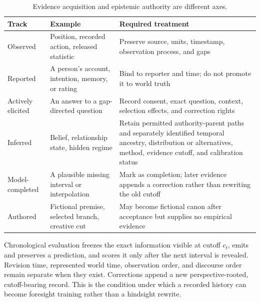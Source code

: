 \documentclass[10pt]{article}
\begin{document}
\begin{table}[H]
\centering
\scriptsize
\begin{tabularx}{\textwidth}{@{}p{}p{}Y@{}}
\toprule
Track & Example & Required treatment \\
\midrule
Observed & Position, recorded action, released statistic & Preserve source, units, timestamp, observation process, and gaps \\
Reported & A person's account, intention, memory, or rating & Bind to reporter and time; do not promote it to world truth \\
Actively elicited & An answer to a gap-directed question & Record consent, exact question, context, selection effects, and correction rights \\
Inferred & Belief, relationship state, hidden regime & Retain permitted authority-parent paths and separately identified temporal ancestry, distribution or alternatives, method, evidence cutoff, and calibration status \\
Model-completed & A plausible missing interval or interpolation & Mark as completion; later evidence appends a correction rather than rewriting the old cutoff \\
Authored & Fictional premise, selected branch, creative cut & May become fictional canon after acceptance but supplies no empirical evidence \\
\bottomrule
\end{tabularx}
\caption{Evidence acquisition and epistemic authority are different axes.}
\label{tab:epistemic-tracks-method}
\end{table}

Chronological evaluation freezes the exact information visible at cutoff
$c_t$, emits and preserves a prediction, and scores it only after the next
interval is revealed. Revision time, represented world time, observation order,
and discourse order remain separate when they exist. Corrections append a new
perspective-rooted, cutoff-bearing record. This is the condition under which a recorded
history can become foresight training rather than a hindsight rewrite.
\end{document}
